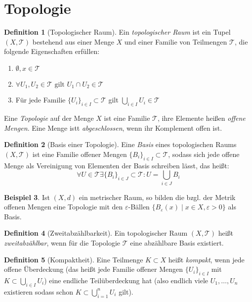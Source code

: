 \documentclass[a4paper]{scrreprt}
\numberwithin{equation}{chapter}
\theoremstyle{definition}
\newtheorem{defn}{Definition}[section]
\newtheorem{bsp}[defn]{Beispiel}
\begin{document}
	\section{Topologie}
		\begin{defn}[Topologischer Raum]
			Ein \emph{topologischer Raum} ist ein Tupel $(X,\mathcal{T})$ bestehend aus einer Menge $X$ und einer Familie von Teilmengen $\mathcal{T}$, die folgende Eigenschaften erfüllen:
			\begin{enumerate}[label=$T$\arabic*]
				\item $\emptyset, x\in \mathcal{T}$
				\item $\forall U_1, U_2\in \mathcal{T} \text{ gilt }U_1\cap U_2\in\mathcal{T}$
				\item Für jede Familie $\lbrace U_i\rbrace_{i\in I}\subset \mathcal{T}$ gilt $\bigcup_{i\in I}U_i\in\mathcal{T}$
			\end{enumerate}
			Eine \emph{Topologie} auf der Menge $X$ ist eine Familie $\mathcal{T}$, ihre Elemente heißen \emph{offene Mengen}. Eine Menge istt \emph{abgeschlossen}, wenn ihr Komplement offen ist.
		\end{defn}
		\begin{defn}[Basis einer Topologie]
			Eine \emph{Basis} eines topologischen Raums $(X,\mathcal{T})$ ist eine Familie offener Mengen $\lbrace B_i\rbrace_{i\in I}\subset \mathcal{T}$, sodass sich jede offene Menge als Vereinigung von Elementen der Basis schreiben lässt, das heißt:
			\begin{equation*}
				\forall U\in\mathcal{T}\exists \lbrace B_i\rbrace_{i\in J}\subset \mathcal{T}: U=\bigcup_{i\in J}B_i
			\end{equation*}
		\end{defn}
		\begin{bsp}
			Ist $(X,d)$ ein metrischer Raum, so bilden die bzgl. der Metrik offenen Mengen eine Topologie mit den $\varepsilon$-Bällen $\lbrace B_{\varepsilon}(x)\mid x\in X, \varepsilon >0\rbrace$ als Basis.
		\end{bsp}
		\begin{defn}[Zweitabzählbarkeit]
			Ein topologischer Raum $(X,\mathcal{T})$ heißt \emph{zweitabzählbar}, wenn für die Topologie $\mathcal{T}$ eine abzählbare Basis existiert. 
		\end{defn}
		\begin{defn}[Kompaktheit]
			Eine Teilmenge $K\subset X$ heißt \emph{kompakt}, wenn jede offene Überdeckung (das heißt jede Familie offener Mengen $\lbrace U_i\rbrace_{i\in I}$ mit $K\subset \bigcup_{i\in I}U_i$) eine endliche Teilüberdeckung hat (also endlich viele $U_1,\ldots,U_n$ existieren sodass schon $K\subset \bigcup_{i=1}^n U_i$ gilt).
		\end{defn}
\end{document}
